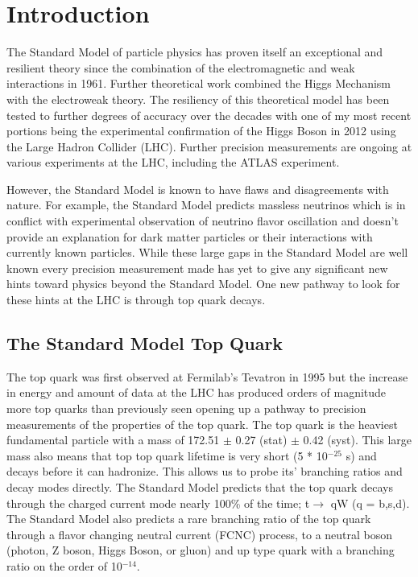 \section{Introduction}
\label{sec:intro}

The Standard Model of particle physics has proven itself an exceptional and resilient theory since the combination of the electromagnetic and weak interactions in 1961\cite{SM1Glashow}.  Further theoretical work combined the Higgs Mechanism\cite{Higgs1,Higgs2} with the electroweak theory\cite{SM2Weinberg, SM3Salam}.  The resiliency of this theoretical model has been tested to further degrees of accuracy over the decades with one of my most recent portions being the experimental confirmation of the Higgs Boson in 2012\cite{Higgs3,Higgs4} using the Large Hadron Collider (LHC).  Further precision measurements are ongoing at various experiments at the LHC, including the ATLAS experiment.

However, the Standard Model is known to have flaws and disagreements with nature.  For example, the Standard Model predicts massless neutrinos which is in conflict with experimental observation of neutrino flavor oscillation and doesn't provide an explanation for dark matter particles or their interactions with currently known particles.  While these large gaps in the Standard Model are well known every precision measurement made has yet to give any significant new hints toward physics beyond the Standard Model.  One new pathway to look for these hints at the LHC is through top quark decays.

\subsection{The Standard Model Top Quark}
The top quark was first observed at Fermilab's Tevatron in 1995\cite{TopObs} but the increase in energy and amount of data at the LHC has produced orders of magnitude more top quarks than previously seen opening up a pathway to precision measurements of the properties of the top quark.  The top quark is the heaviest fundamental particle with a mass of 172.51 $\pm$ 0.27 (stat) $\pm$ 0.42 (syst)\cite{TopMass2017}.  This large mass also means that top top quark lifetime is very short (5 * 10$^{-25}$ s) and decays before it can hadronize.  This allows us to probe its' branching ratios and decay modes directly.  The Standard Model predicts that the top quark decays through the charged current mode nearly 100\% of the time; t$\rightarrow$ qW (q = b,s,d)\cite{PDG2018}.   The Standard Model also predicts a rare branching ratio of the top quark through a flavor changing neutral current (FCNC) process, to a neutral boson (photon, Z boson, Higgs Boson, or gluon) and up type quark with a branching ratio on the order of 10$^{-14}$.

